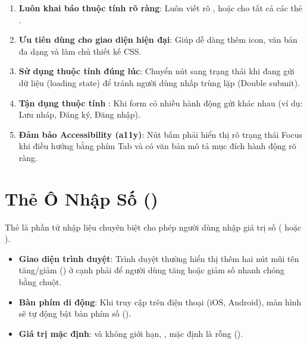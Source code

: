 \begin{tipBox}
\begin{enumerate}[leftmargin=1.5em, itemsep=2pt, parsep=0pt]
    \item \textbf{Luôn khai báo thuộc tính  rõ ràng}: Luôn viết rõ ,  hoặc  cho tất cả các thẻ .
    \item \textbf{Ưu tiên dùng  cho giao diện hiện đại}: Giúp dễ dàng thêm icon, văn bản đa dạng và làm chủ thiết kế CSS.
    \item \textbf{Sử dụng thuộc tính  đúng lúc}: Chuyển nút sang trạng thái  khi đang gửi dữ liệu (loading state) để tránh người dùng nhấp trùng lặp (Double submit).
    \item \textbf{Tận dụng thuộc tính }: Khi form có nhiều hành động gửi khác nhau (ví dụ: Lưu nháp, Đăng ký, Đăng nhập).
    \item \textbf{Đảm bảo Accessibility (a11y)}: Nút bấm phải hiển thị rõ trạng thái Focus khi điều hướng bằng phím Tab và có văn bản mô tả mục đích hành động rõ ràng.
\end{enumerate}
\end{tipBox}

\section[Thẻ Ô Nhập Số (\taghint{<input type="number">})]{Thẻ Ô Nhập Số ()}
\label{sec:html_number}

\begin{conceptBox}[Định Nghĩa Thẻ Ô Nhập Số input type="number"]
Thẻ  là phần tử nhập liệu chuyên biệt cho phép người dùng nhập giá trị số ( hoặc ). 
\begin{itemize}[leftmargin=1.5em, itemsep=2pt, parsep=0pt]
    \item \textbf{Giao diện trình duyệt}: Trình duyệt thường hiển thị thêm hai nút mũi tên tăng/giảm () ở cạnh phải để người dùng tăng hoặc giảm số nhanh chóng bằng chuột.
    \item \textbf{Bàn phím di động}: Khi truy cập trên điện thoại (iOS, Android), màn hình sẽ tự động bật bàn phím số ().
    \item \textbf{Giá trị mặc định}:  và  không giới hạn, ,  mặc định là rỗng ().
\end{itemize}
\end{conceptBox}

